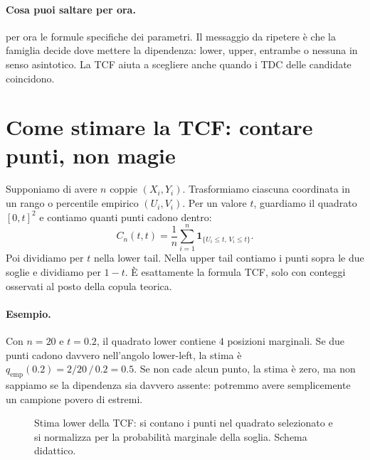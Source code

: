 \documentclass[11pt,a4paper]{article}
\newcommand{\Esempio}{\paragraph{Esempio.}}
\newcommand{\Salta}{\paragraph{Cosa puoi saltare per ora.}}
\begin{document}
\Salta per ora le formule specifiche dei parametri. Il messaggio da ripetere è
che la famiglia decide dove mettere la dipendenza: lower, upper, entrambe o
nessuna in senso asintotico. La TCF aiuta a scegliere anche quando i TDC delle
candidate coincidono.

\section{Come stimare la TCF: contare punti, non magie}

Supponiamo di avere $n$ coppie $(X_i,Y_i)$. Trasformiamo ciascuna coordinata in
un rango o percentile empirico $(U_i,V_i)$. Per un valore $t$, guardiamo il
quadrato $[0,t]^2$ e contiamo quanti punti cadono dentro:
\begin{equation}
 C_n(t,t)=\frac1n\sum_{i=1}^n
 \mathbf{1}_{\{U_i\leq t,\,V_i\leq t\}}.
 \end{equation}
Poi dividiamo per $t$ nella lower tail. Nella upper tail contiamo i punti sopra
le due soglie e dividiamo per $1-t$. È esattamente la formula TCF, solo con
conteggi osservati al posto della copula teorica.

\Esempio Con $n=20$ e $t=0.2$, il quadrato lower contiene $4$ posizioni
marginali. Se due punti cadono davvero nell'angolo lower-left, la stima è
$q_{\mathrm{emp}}(0.2)=2/20\,/\,0.2=0.5$. Se non cade alcun punto, la stima
è zero, ma non sappiamo se la dipendenza sia davvero assente: potremmo avere
semplicemente un campione povero di estremi.

\begin{figure}[ht]
\centering
{}
\caption{Stima lower della TCF: si contano i punti nel quadrato selezionato e si normalizza per la probabilità marginale della soglia. Schema didattico.}
\label{fig:tcf-count}
\end{figure}
\end{document}
